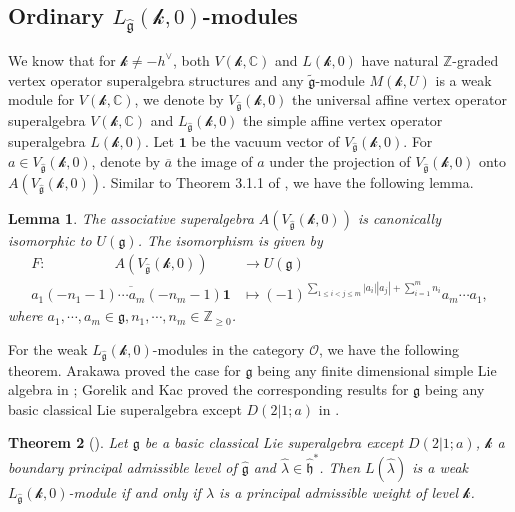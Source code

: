 \documentclass[12pt]{article}
\newtheorem{thm}{Theorem}[section]
\newtheorem{lem}[thm]{Lemma}
\begin{document}
\subsection{Ordinary $L_{\widehat{\mathfrak{g}}}(\mathcal{k},0)$-modules }
We know that for $\mathcal{k}\neq -h^\vee$, both
$V(\mathcal{k},\mathbb{C})$ and $L(\mathcal{k},0)$ have natural
$\mathbb{Z}$-graded vertex operator superalgebra structures
and any $\widetilde{\mathfrak{g}}$-module $M(\mathcal{k},U)$ is a weak module for $V(\mathcal{k},\mathbb{C})$,
we denote by $V_{\widehat{\mathfrak{g}}}(\mathcal{k},0)$ the universal affine vertex operator superalgebra $V(\mathcal{k},\mathbb{C})$
and $L_{\widehat{\mathfrak{g}}}(\mathcal{k},0)$ the simple affine vertex operator superalgebra $L(\mathcal{k},0)$.
Let $\mathbf{1}$ be the vacuum vector of $V_{\widehat{\mathfrak{g}}}(\mathcal{k},0)$.
For $a\in V_{\widehat{\mathfrak{g}}}(\mathcal{k},0)$, denote by $\overline{a}$ the image of $a$ under the projection of $V_{\widehat{\mathfrak{g}}}(\mathcal{k},0)$ onto $A(V_{\widehat{\mathfrak{g}}}(\mathcal{k},0))$.
Similar to Theorem 3.1.1 of \cite{FZ92}, we have the following lemma.
\begin{lem}\label{lemzhu}
The associative superalgebra $A(V_{\widehat{\mathfrak{g}}}(\mathcal{k},0))$ is canonically isomorphic to $U(\mathfrak{g})$.
The isomorphism is given by
\begin{equation*}
\begin{aligned}
F:~~~~~~~~~~~~~~~~~~~~~~A(V_{\widehat{\mathfrak{g}}}(\mathcal{k},0))&\rightarrow U(\mathfrak{g})\\
\overline{a_1(-n_1-1)\cdots a_m(-n_m-1)\mathbf{1}}&\mapsto (-1)^{\sum_{1\leq i<j\leq m}|a_i||a_j|+\sum_{i=1}^{m} n_i}a_m\cdots a_1,
\end{aligned}
\end{equation*}
where $a_1,\cdots,a_m\in\mathfrak{g},n_1,\cdots,n_m\in\mathbb{Z}_{\geq 0}$.
\end{lem}

For the weak $L_{\widehat{\mathfrak{g}}}(\mathcal{k},0)$-modules in the category $\mathcal{O}$, we have the following theorem.
Arakawa proved the case for $\mathfrak{g}$ being any finite dimensional simple Lie algebra in \cite{Ar16};
Gorelik and Kac proved the corresponding results for $\mathfrak{g}$ being any basic classical Lie superalgebra
except $D(2|1;a)$ in \cite{GK25}.
\begin{thm}[\cite{Ar16,GK25}]\label{thmar16}
Let $\mathfrak{g}$ be a basic classical Lie superalgebra
except $D(2|1;a)$, $\mathcal{k}$ a boundary principal admissible level of $\widehat{\mathfrak{g}}$ and $\hat{\lambda}\in \widehat{\mathfrak{h}}^*$.
Then $L(\hat{\lambda})$ is a weak $L_{\widehat{\mathfrak{g}}}(\mathcal{k},0)$-module if and only if
$\hat{\lambda}$ is a principal admissible weight of level $\mathcal{k}$.
\end{thm}
\end{document}
